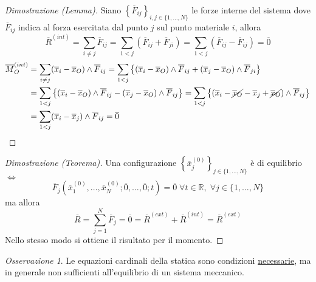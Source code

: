 \documentclass{book}
\theoremstyle{plain}
\theoremstyle{plain}
\theoremstyle{plain}
\theoremstyle{plain}
\theoremstyle{plain}
\theoremstyle{definition}
\theoremstyle{remark}
\newtheorem*{oss}{Osservazione}
\theoremstyle{definition}
\begin{document}
\begin{proof}[Dimostrazione (Lemma)]
    Siano $\left\{\overline{F}_{ij}\right\}_{i,j\in\{1,\ldots,N\}}$ le forze interne del sistema dove $\overline{F}_{ij}$ indica al forza esercitata dal punto $j$ sul punto materiale $i$, allora
    \begin{displaymath}
        \overline{R}^{(int)}=\sum_{i\neq j}\overline{F}_{ij}=\sum_{1<j}(\overline{F}_{ij}+\overline{F}_{ji})=\sum_{1<j}(\overline{F}_{ij}-\overline{F}_{ij})=\overline{0}
    \end{displaymath}
    \[
    \begin{split}
        \overline{M}_O^{(int)}&=\sum_{i\neq j}(\overline{x}_i-\overline{x}_O)\wedge\overline{F}_{ij}=\sum_{1<j}\left\{(\overline{x}_i-\overline{x}_O)\wedge\overline{F}_{ij}+(\overline{x}_j-\overline{x}_O)\wedge\overline{F}_{ji}\right\} \\
        &=\sum_{1<j}\left\{(\overline{x}_i-\overline{x}_O)\wedge\overline{F}_{ij}-(\overline{x}_j-\overline{x}_O)\wedge\overline{F}_{ij}\right\}=\sum_{1<j}\left\{(\overline{x}_i-\cancel{\overline{x}_O}-\overline{x}_j+\cancel{\overline{x}_O})\wedge\overline{F}_{ij}\right\} \\
        &=\sum_{1<j}(\overline{x}_i-\overline{x}_j)\wedge\overline{F}_{ij}=\overline{0}
    \end{split}
    \]
\end{proof}

\begin{proof}[Dimostrazione (Teorema)]
    Una configurazione $\left\{\overline{x}_j^{(0)}\right\}_{j\in\{1,\ldots,N\}}$ è di equilibrio $\iff$
    \begin{displaymath}
        \overline{F}_{j}\left(\overline{x}_{1}^{(0)}, \ldots, \overline{x}_{N}^{(0)}; \overline{0}, \ldots, \overline{0}; t\right)=\overline{0} \;\forall t \in \mathbb{R}, \;\forall j \in \{1,\ldots,N\}
    \end{displaymath}
    ma allora
    \begin{displaymath}
        \overline{R}=\sum_{j=1}^N\overline{F}_j=\overline{0}=\overline{R}^{(ext)}+\overline{R}^{(int)}=\overline{R}^{(ext)}
    \end{displaymath}
    Nello stesso modo si ottiene il risultato per il momento.
\end{proof}

\begin{oss}
    Le equazioni cardinali della statica sono condizioni \underline{necessarie}, ma in generale non sufficienti all'equilibrio di un sistema meccanico.
\end{oss}
\end{document}

